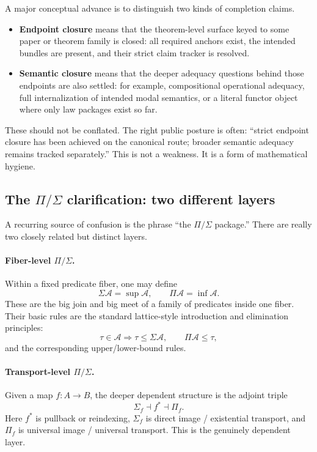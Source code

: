 \documentclass[11pt]{article}
\begin{document}
A major conceptual advance is to distinguish two kinds of completion claims.

\begin{itemize}
  \item \textbf{Endpoint closure} means that the theorem-level surface keyed to some paper or theorem family is closed: all required anchors exist, the intended bundles are present, and their strict claim tracker is resolved.
  \item \textbf{Semantic closure} means that the deeper adequacy questions behind those endpoints are also settled: for example, compositional operational adequacy, full internalization of intended modal semantics, or a literal functor object where only law packages exist so far.
\end{itemize}

These should not be conflated. The right public posture is often: ``strict endpoint closure has been achieved on the canonical route; broader semantic adequacy remains tracked separately.'' This is not a weakness. It is a form of mathematical hygiene.

\subsection{\texorpdfstring{The $\Pi/\Sigma$ clarification}{The Pi/Sigma clarification}: two different layers}

A recurring source of confusion is the phrase ``the $\Pi/\Sigma$ package.'' There are really two closely related but distinct layers.

\paragraph{Fiber-level $\Pi/\Sigma$.}
Within a fixed predicate fiber, one may define
\[
\Sigma \mathcal{A} = \sup \mathcal{A}, \qquad \Pi \mathcal{A} = \inf \mathcal{A}.
\]
These are the big join and big meet of a family of predicates inside one fiber. Their basic rules are the standard lattice-style introduction and elimination principles:
\[
\tau \in \mathcal{A} \Rightarrow \tau \leq \Sigma \mathcal{A},
\qquad
\Pi \mathcal{A} \leq \tau,
\]
and the corresponding upper/lower-bound rules.

\paragraph{Transport-level $\Pi/\Sigma$.}
Given a map $f : A \to B$, the deeper dependent structure is the adjoint triple
\[
\Sigma_f \dashv f^* \dashv \Pi_f.
\]
Here $f^*$ is pullback or reindexing, $\Sigma_f$ is direct image / existential transport, and $\Pi_f$ is universal image / universal transport. This is the genuinely dependent layer.
\end{document}
